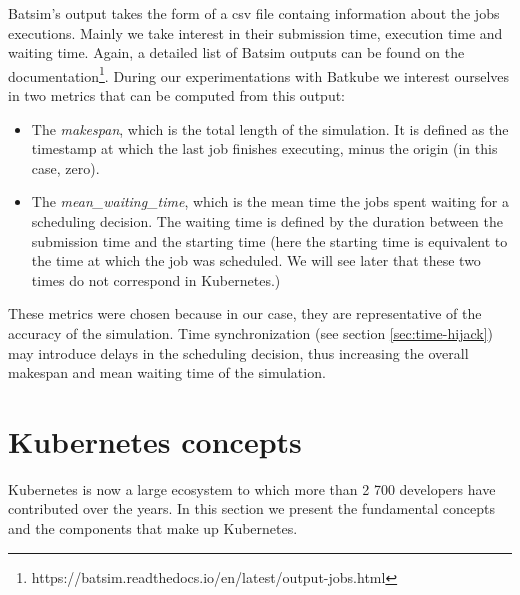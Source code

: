 Batsim's output takes the form of a csv file containg information about the
jobs executions. Mainly we take interest in their submission time, execution
time and waiting time. Again, a detailed list of Batsim outputs can be found on
the
documentation\footnote{https://batsim.readthedocs.io/en/latest/output-jobs.html}.
During our experimentations with Batkube we interest ourselves in two metrics
that can be computed from this output:
\begin{itemize}
	\item The \textit{makespan}, which is the total length of the
		simulation. It is defined as the timestamp at which the last
		job finishes executing, minus the origin (in this case, zero).
	\item The \textit{mean\_waiting\_time}, which is the mean time the jobs
		spent waiting for a scheduling decision. The waiting time is
		defined by the duration between the submission time and the
		starting time (here the starting time is equivalent to the time
		at which the job was scheduled. We will see later that these
		two times do not correspond in Kubernetes.)
\end{itemize}

These metrics were chosen because in our case, they are representative of the
accuracy of the simulation. Time synchronization (see section
\ref{sec:time-hijack}) may introduce delays in the scheduling decision, thus
increasing the overall makespan and mean waiting time of the simulation.

\section{Kubernetes concepts}

Kubernetes is now a large ecosystem to which more than 2 700 developers have
contributed over the years. In this section we present the fundamental concepts
and the components that make up Kubernetes.

